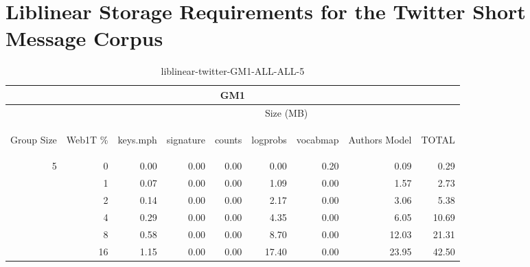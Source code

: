 \chapter{Liblinear Storage Requirements for the Twitter Short Message Corpus}

\begin{center}
\begin{table}[htbp]
\begin{tabular}{ | r | r | r | r | r | r | r | r | r |}
\hline
\multicolumn{9}{|c|}{GM1}\\
\hline
 & & \multicolumn{7}{|c|}{Size (MB)}\\ \cline{3-9}
\begin{sideways}Group Size\end{sideways} & \begin{sideways}Web1T \% \end{sideways} & \begin{sideways}keys.mph\end{sideways} & \begin{sideways}signature\end{sideways} & \begin{sideways}counts\end{sideways} & \begin{sideways}logprobs\end{sideways} & \begin{sideways}vocabmap\end{sideways} & \begin{sideways}Authors Model \end{sideways} & \begin{sideways}TOTAL\end{sideways}\\
\hline
\multirow{5}{*}{5}
 & 0 & 0.00 & 0.00 & 0.00 & 0.00 & 0.20 & 0.09 & 0.29\\ \cline{2-9}
 & 1 & 0.07 & 0.00 & 0.00 & 1.09 & 0.00 & 1.57 & 2.73\\ \cline{2-9}
 & 2 & 0.14 & 0.00 & 0.00 & 2.17 & 0.00 & 3.06 & 5.38\\ \cline{2-9}
 & 4 & 0.29 & 0.00 & 0.00 & 4.35 & 0.00 & 6.05 & 10.69\\ \cline{2-9}
 & 8 & 0.58 & 0.00 & 0.00 & 8.70 & 0.00 & 12.03 & 21.31\\ \cline{2-9}
 & 16 & 1.15 & 0.00 & 0.00 & 17.40 & 0.00 & 23.95 & 42.50\\ \cline{2-9}
\hline
\end{tabular}
\caption{liblinear-twitter-GM1-ALL-ALL-5}
\label{table:liblinear-twitter-GM1-ALL-ALL-5}
\end{table}
\end{center}

